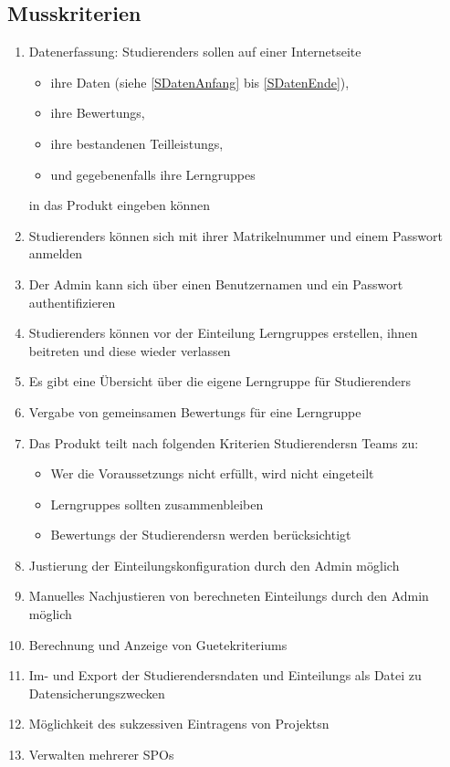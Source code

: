\documentclass[parskip=full]{scrartcl}
\newcommand{\swtLabel}[1]{\textbf{/#1\arabic*0/}}
\begin{document}
\subsection{Musskriterien}
 \begin{enumerate}[label=\swtLabel{M}]
   \item Datenerfassung: \glspl{Studierender} sollen auf einer Internetseite  
   \begin{itemize}
     \item ihre Daten (siehe \ref{SDatenAnfang} bis \ref{SDatenEnde}),     
     \item ihre \glspl{Bewertung}, 
     \item ihre bestandenen \glspl{Teilleistung},
     \item und gegebenenfalls ihre \glspl{Lerngruppe}
   \end{itemize}
   in das Produkt eingeben können
   \item \glspl{Studierender} können sich mit ihrer \gls{Matrikelnummer} und einem Passwort anmelden
   \item Der \gls{Admin} kann sich über einen \gls{Benutzername}n und ein Passwort authentifizieren
   \item \glspl{Studierender} können vor der \gls{Einteilung} \glspl{Lerngruppe} erstellen, ihnen beitreten und diese wieder verlassen
    \item Es gibt eine Übersicht über die eigene \gls{Lerngruppe} für
    \glspl{Studierender}
    \item Vergabe von gemeinsamen  \glspl{Bewertung} für eine \gls{Lerngruppe}
   \item Das Produkt teilt nach folgenden Kriterien \glspl{Studierender}n \glspl{Team} zu:
   \label{Mzuteilung}
   \begin{itemize}
     \item Wer die \glspl{Voraussetzung} nicht erfüllt, wird nicht eingeteilt
     \item \glspl{Lerngruppe} sollten zusammenbleiben
     \item \glspl{Bewertung} der \glspl{Studierender}n werden berücksichtigt
   \end{itemize}
     \item Justierung der \gls{Einteilungskonfiguration} durch den \gls{Admin} möglich
   \item Manuelles Nachjustieren von berechneten \glspl{Einteilung} durch den \gls{Admin} möglich
   \item Berechnung und Anzeige von \glspl{Guetekriterium}
   \item Im- und Export der \glspl{Studierender}ndaten und
   \glspl{Einteilung} als Datei zu Datensicherungszwecken
   \item Möglichkeit des sukzessiven Eintragens von \glspl{Projekt}n
   \item Verwalten mehrerer \glspl{SPO}
  
 \end{enumerate}
\end{document}
